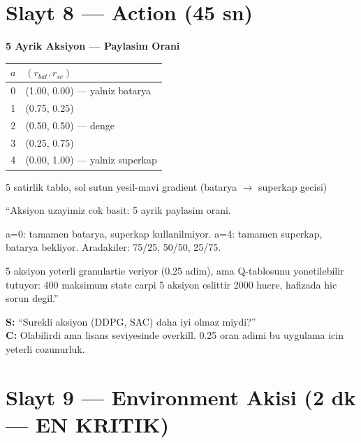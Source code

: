 \documentclass[11pt,a4paper]{article}
\begin{document}
\section{Slayt 8 --- Action (45 sn)}

\begin{slytboks}
\textbf{5 Ayrik Aksiyon --- Paylasim Orani}
\begin{center}
\begin{tabular}{cl}
\toprule
$a$ & $(r_{bat}, r_{sc})$ \\
\midrule
0 & (1.00, 0.00) --- yalniz batarya \\
1 & (0.75, 0.25) \\
2 & (0.50, 0.50) --- denge \\
3 & (0.25, 0.75) \\
4 & (0.00, 1.00) --- yalniz superkap \\
\bottomrule
\end{tabular}
\end{center}
\end{slytboks}

\begin{gorselboks}
5 satirlik tablo, sol sutun yesil-mavi gradient (batarya $\to$ superkap gecisi)
\end{gorselboks}

\begin{sayboks}
``Aksiyon uzayimiz cok basit: 5 ayrik paylasim orani.

a=0: tamamen batarya, superkap kullanilmiyor. a=4: tamamen superkap, batarya bekliyor. Aradakiler: 75/25, 50/50, 25/75.

5 aksiyon yeterli granulartie veriyor (0.25 adim), ama Q-tablosunu yonetilebilir tutuyor: 400 maksimum state carpi 5 aksiyon eslittir 2000 hucre, hafizada hic sorun degil.''
\end{sayboks}

\begin{soruboks}
\textbf{S:} ``Surekli aksiyon (DDPG, SAC) daha iyi olmaz miydi?''\\
\textbf{C:} Olabilirdi ama lisans seviyesinde overkill. 0.25 oran adimi bu uygulama icin yeterli cozunurluk.
\end{soruboks}

\section{Slayt 9 --- Environment Akisi (2 dk --- EN KRITIK)}
\end{document}
